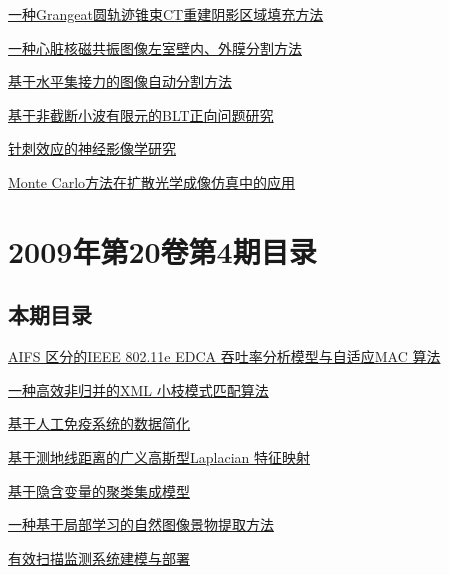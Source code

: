 \documentclass[a4paper]{article}
\begin{document}
\href{http://www.jos.org.cn/ch/reader/download_pdf.aspx?file_no=3545&year_id=2009&quarter_id=5&falg=1}{一种Grangeat圆轨迹锥束CT重建阴影区域填充方法}

\href{http://www.jos.org.cn/ch/reader/download_pdf.aspx?file_no=3557&year_id=2009&quarter_id=5&falg=1}{一种心脏核磁共振图像左室壁内、外膜分割方法}

\href{http://www.jos.org.cn/ch/reader/download_pdf.aspx?file_no=3541&year_id=2009&quarter_id=5&falg=1}{基于水平集接力的图像自动分割方法}

\href{http://www.jos.org.cn/ch/reader/download_pdf.aspx?file_no=3567&year_id=2009&quarter_id=5&falg=1}{基于非截断小波有限元的BLT正向问题研究}

\href{http://www.jos.org.cn/ch/reader/download_pdf.aspx?file_no=3540&year_id=2009&quarter_id=5&falg=1}{针刺效应的神经影像学研究}

\href{http://www.jos.org.cn/ch/reader/download_pdf.aspx?file_no=3537&year_id=2009&quarter_id=5&falg=1}{Monte Carlo方法在扩散光学成像仿真中的应用}


\section{\textbf{2009年第20卷第4期目录}}
\subsection{本期目录}
\href{http://www.jos.org.cn/ch/reader/download_pdf.aspx?file_no=3269&year_id=2009&quarter_id=4&falg=1}{AIFS 区分的IEEE 802.11e EDCA 吞吐率分析模型与自适应MAC 算法}

\href{http://www.jos.org.cn/ch/reader/download_pdf.aspx?file_no=3268&year_id=2009&quarter_id=4&falg=1}{一种高效非归并的XML 小枝模式匹配算法}

\href{http://www.jos.org.cn/ch/reader/download_pdf.aspx?file_no=3252&year_id=2009&quarter_id=4&falg=1}{基于人工免疫系统的数据简化}

\href{http://www.jos.org.cn/ch/reader/download_pdf.aspx?file_no=3425&year_id=2009&quarter_id=4&falg=1}{基于测地线距离的广义高斯型Laplacian 特征映射}

\href{http://www.jos.org.cn/ch/reader/download_pdf.aspx?file_no=3431&year_id=2009&quarter_id=4&falg=1}{基于隐含变量的聚类集成模型}

\href{http://www.jos.org.cn/ch/reader/download_pdf.aspx?file_no=3439&year_id=2009&quarter_id=4&falg=1}{一种基于局部学习的自然图像景物提取方法}

\href{http://www.jos.org.cn/ch/reader/download_pdf.aspx?file_no=3337&year_id=2009&quarter_id=4&falg=1}{有效扫描监测系统建模与部署}
\end{document}
